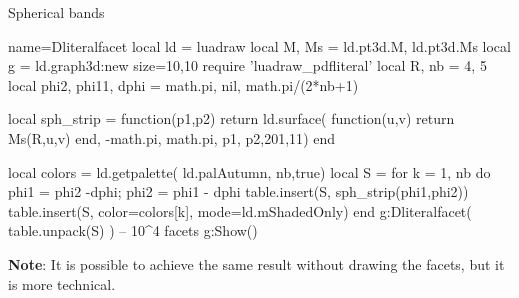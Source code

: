 \begin{demo}{Spherical bands}
\begin{luadraw}{name=Dliteralfacet}
local ld = luadraw
local M, Ms = ld.pt3d.M, ld.pt3d.Ms
local g = ld.graph3d:new{ size={10,10} }
require 'luadraw_pdfliteral'
local R, nb = 4, 5
local phi2, phi11, dphi = math.pi, nil, math.pi/(2*nb+1)

local sph_strip = function(p1,p2)
    return ld.surface( function(u,v) return Ms(R,u,v) end, -math.pi, math.pi, p1, p2,{201,11})
end

local colors = ld.getpalette( ld.palAutumn, nb,true)
local S = {}
for k = 1, nb do
    phi1 = phi2 -dphi; phi2 = phi1 - dphi
    table.insert(S, sph_strip(phi1,phi2))
    table.insert(S, {color=colors[k], mode=ld.mShadedOnly})
end
g:Dliteralfacet( table.unpack(S) ) -- 10^4 facets
g:Show()
\end{luadraw}
\end{demo}

\textbf{Note}: It is possible to achieve the same result without drawing the facets, but it is more technical.
